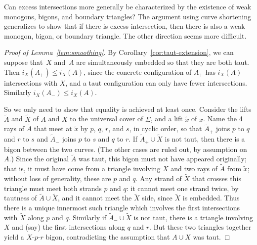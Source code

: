 \begin{question}
  Can excess intersections more generally be characterized by the
  existence of weak monogons, bigons, and boundary triangles?  The
  argument using curve shortening generalizes to show that if there is
  excess intersection, then there is also a weak monogon, bigon, or
  boundary triangle.  The other direction seems more difficult.
\end{question}
\begin{proof}[Proof of Lemma~\ref{lem:smoothing}]
  By Corollary~\ref{cor:taut-extension}, we can suppose that~$X$
  and~$A$ are simultaneously embedded so that they are both taut.
  Then $i_X(A_+) \leq i_X(A)$, since the concrete configuration of $A_+$
  has $i_X(A)$ intersections with $X$, and a taut configuration can only
  have fewer intersections.  Similarly $i_X(A_-) \leq i_X(A)$.

  So we only need to show that equality is achieved at least once.
  Consider the lifts $\tilde A$ and $\tilde X$ of $A$ and $X$ to the
  universal cover of $\Sigma$, and a lift $\tilde x$ of $x$.  Name the 4
  rays of $\tilde A$ that meet at $\tilde x$ by $p$, $q$, $r$, and
  $s$, in cyclic order, so that $\tilde A_+$ joins $p$ to $q$ and $r$
  to $s$ and $\tilde A_-$ joins $p$ to $s$ and $q$ to $r$.
  If $\tilde A_+ \cup \tilde X$ is not taut, then there is a bigon
  between the two curves.  (The other cases are ruled out, by
  assumption on $A$.)  Since the original $\tilde A$ was taut, this bigon
  must not have appeared originally; that is, it must have come from a
  triangle involving $X$ and two rays of $\tilde A$ from $\tilde x$; without
  loss of generality, these are $p$ and $q$.  Any strand of $\tilde X$ that
  crosses this triangle must meet both strands $p$ and $q$: it cannot
  meet one strand twice, by tautness of $\tilde A \cup \tilde X$, and it
  cannot meet the $\tilde X$ side, since $\tilde X$ is embedded.  Thus
  there is a unique innermost such triangle which involves the first
  intersections with $\tilde X$ along $p$ and $q$.  Similarly if
  $\tilde A_- \cup \tilde X$ is not taut, there is a triangle involving
  $X$ and (say) the first intersections along $q$ and $r$. But these
  two triangles together yield a $X$-$p$-$r$ bigon, contradicting the
  assumption that $A \cup X$ was taut.
\end{proof}